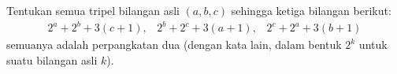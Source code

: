 Tentukan semua tripel bilangan asli $(a,b,c)$ sehingga ketiga bilangan berikut:
\begin{align*}
    2^a+2^b+3(c+1), \hspace{10pt} 2^b+2^c+3(a+1), \hspace{10pt} 2^c+2^a+3(b+1)
\end{align*}
semuanya adalah perpangkatan dua (dengan kata lain, dalam bentuk $2^k$ untuk suatu bilangan asli $k$).